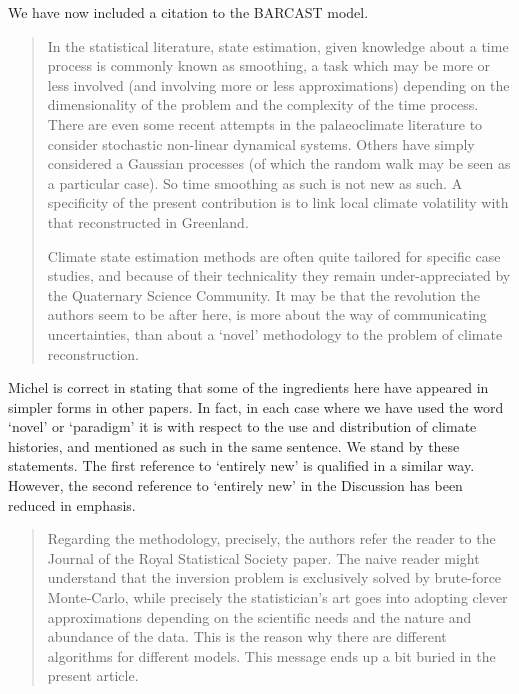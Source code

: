 \documentclass[a4paper,11pt]{article}
\begin{document}
We have now included a citation to the BARCAST model.

\begin{framed} \begin{quote}
In the statistical literature, state estimation, given knowledge about a time process is commonly known as smoothing, a task which may be more or less involved (and involving more or less approximations) depending on the dimensionality of the problem and the complexity of the time process. There are even some recent attempts in the palaeoclimate literature to consider stochastic non-linear dynamical systems. Others have simply considered a Gaussian processes (of which the random walk may be seen as a particular case).  So time smoothing as such is not new as such. A specificity of the present contribution is to link local climate volatility with that reconstructed in Greenland. 

Climate state estimation methods are often quite tailored for specific case studies, and because of their technicality they remain under-appreciated by the Quaternary Science Community. It may be that the revolution the authors seem to be after here, is more about the way of communicating uncertainties, than about a `novel' methodology to the problem of climate reconstruction.
\end{quote} \end{framed}

Michel is correct in stating that some of the ingredients here have appeared in simpler forms in other papers. In fact, in each case where we have used the word `novel' or `paradigm' it is with respect to the use and distribution of climate histories, and mentioned as such in the same sentence. We stand by these statements. The first reference to `entirely new' is qualified in a similar way. However, the second reference to `entirely new' in the Discussion has been reduced in emphasis. 

\begin{framed} \begin{quote}
Regarding the methodology, precisely, the authors refer the reader to the Journal of the Royal Statistical Society paper. The naive reader might understand that the inversion problem is exclusively solved by brute-force Monte-Carlo, while precisely the statistician's art goes into adopting clever approximations depending on the scientific needs and the nature and abundance of the data. This is the reason why there are different algorithms for different models. This message ends up a bit buried in the present article. 
\end{quote} \end{framed}
\end{document}
